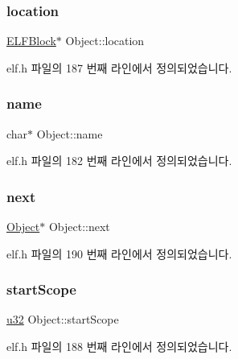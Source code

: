 \subsubsection{\texorpdfstring{location}{location}}
{\footnotesize\ttfamily \mbox{\hyperlink{struct_e_l_f_block}{E\+L\+F\+Block}}$\ast$ Object\+::location}



elf.\+h 파일의 187 번째 라인에서 정의되었습니다.

\mbox{\label{struct_object_a1792dbef505e3bb7eab133117b431010}} 
\subsubsection{\texorpdfstring{name}{name}}
{\footnotesize\ttfamily char$\ast$ Object\+::name}



elf.\+h 파일의 182 번째 라인에서 정의되었습니다.

\mbox{\label{struct_object_a29524055e3b5fe5df2e3c41fa81ff1ff}} 
\subsubsection{\texorpdfstring{next}{next}}
{\footnotesize\ttfamily \mbox{\hyperlink{struct_object}{Object}}$\ast$ Object\+::next}



elf.\+h 파일의 190 번째 라인에서 정의되었습니다.

\mbox{\label{struct_object_a15512a3ed1b2415c37a5d240a215cbb4}} 
\subsubsection{\texorpdfstring{start\+Scope}{startScope}}
{\footnotesize\ttfamily \mbox{\hyperlink{_system_8h_a10e94b422ef0c20dcdec20d31a1f5049}{u32}} Object\+::start\+Scope}



elf.\+h 파일의 188 번째 라인에서 정의되었습니다.

\mbox{\label{struct_object_ae0e4e287e6fcefa00b8ae4e4c127ffa9}} 
